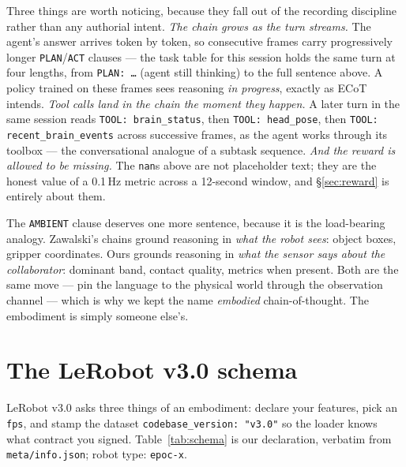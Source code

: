 \documentclass{article}
\begin{document}
Three things are worth noticing, because they fall out of the recording discipline rather than any authorial intent. \emph{The chain grows as the turn streams.} The agent's answer arrives token by token, so consecutive frames carry progressively longer \texttt{PLAN}/\texttt{ACT} clauses --- the task table for this session holds the same turn at four lengths, from \texttt{PLAN: …} (agent still thinking) to the full sentence above. A policy trained on these frames sees reasoning \emph{in progress}, exactly as ECoT intends. \emph{Tool calls land in the chain the moment they happen.} A later turn in the same session reads \texttt{TOOL: brain\_status}, then \texttt{TOOL: head\_pose}, then \texttt{TOOL: recent\_brain\_events} across successive frames, as the agent works through its toolbox --- the conversational analogue of a subtask sequence. \emph{And the reward is allowed to be missing.} The \texttt{nan}s above are not placeholder text; they are the honest value of a 0.1\,Hz metric across a 12-second window, and \S\ref{sec:reward} is entirely about them.

The \texttt{AMBIENT} clause deserves one more sentence, because it is the load-bearing analogy. Zawalski's chains ground reasoning in \emph{what the robot sees}: object boxes, gripper coordinates. Ours grounds reasoning in \emph{what the sensor says about the collaborator}: dominant band, contact quality, metrics when present. Both are the same move --- pin the language to the physical world through the observation channel --- which is why we kept the name \emph{embodied} chain-of-thought. The embodiment is simply someone else's.

\section{The LeRobot v3.0 schema}
\label{sec:schema}

LeRobot v3.0 asks three things of an embodiment: declare your features, pick an \texttt{fps}, and stamp the dataset \texttt{codebase\_version: "v3.0"} so the loader knows what contract you signed. Table~\ref{tab:schema} is our declaration, verbatim from \texttt{meta/info.json}; robot type: \texttt{epoc-x}.
\end{document}
